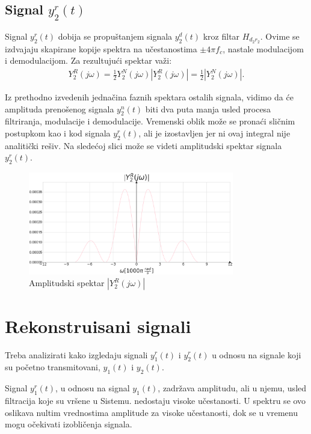 \documentclass[titlepage,a4paper,12pt]{article}
\begin{document}
	\clearpage
	
	\subsection{Signal $y_2^r(t)$}
	Signal $y_2^r(t)$ dobija se propuštanjem signala $y_2^d(t)$ kroz filtar $H_{d_2r_2}$. Ovime se izdvajaju skapirane kopije spektra na učestanostima $\pm 4\pi f_c$, nastale modulacijom i demodulacijom. Za rezultujući spektar važi:
	\begin{gather}
		Y_2^R(j\omega) = \frac{1}{2} Y_2^N(j\omega)
		|Y_2^R(j\omega)| = \frac{1}{2}|Y_2^N(j\omega)|.
	\end{gather}
	
	Iz prethodno izvedenih jednačina faznih spektara ostalih signala, vidimo da će amplituda prenošenog signala $y_2^n(t)$ biti dva puta manja usled procesa filtriranja, modulacije i demodulacije. Vremenski oblik može se pronaći sličnim postupkom kao i kod signala $y_2^r(t)$, ali je izostavljen jer ni ovaj integral nije analitički rešiv. Na sledećoj slici može se videti amplitudski spektar signala $y_2^r(t)$.
	\begin{figure}[ht]
		\centering
		\includegraphics[width=0.8\textwidth]{Images/AmpY2R.png}
		\caption{Amplitudski spektar $|Y_2^R(j\omega)|$}\label{fig:AmpY2R}
	\end{figure}
	\FloatBarrier
	\pagebreak
	\clearpage
	
	\section{Rekonstruisani signali}
	Treba analizirati kako izgledaju signali $y_1^r(t)$ i $y_2^r(t)$ u odnosu na signale koji su početno transmitovani, $y_1(t)$ i $y_2(t)$.
	
	Signal $y_1^r(t)$, u odnosu na signal $y_1(t)$, zadržava amplitudu, ali u njemu, usled filtracija koje su vršene u Sistemu. nedostaju visoke učestanosti. U spektru se ovo oslikava nultim vrednostima amplitude za visoke učestanosti, dok se u vremenu mogu očekivati izobličenja signala.
	
\end{document}
